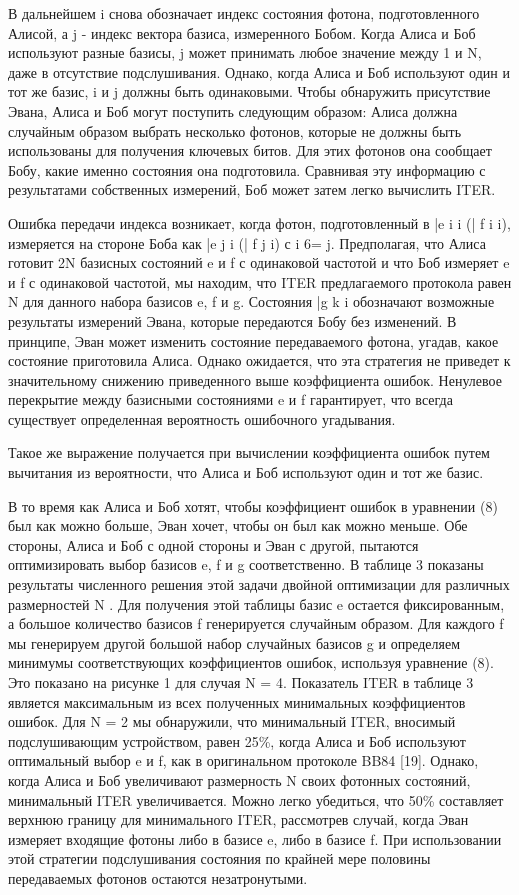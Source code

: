В дальнейшем i снова обозначает индекс состояния фотона, подготовленного Алисой, а j - индекс вектора базиса, измеренного Бобом. Когда Алиса и Боб используют разные базисы, j может принимать любое значение между 1 и N, даже в отсутствие подслушивания. Однако, когда Алиса и Боб используют один и тот же базис, i и j должны быть одинаковыми. Чтобы обнаружить присутствие Эвана, Алиса и Боб могут поступить следующим образом: Алиса должна случайным образом выбрать несколько фотонов, которые не должны быть использованы для получения ключевых битов. Для этих фотонов она сообщает Бобу, какие именно состояния она подготовила. Сравнивая эту информацию с результатами собственных измерений, Боб может затем легко вычислить ITER.

Ошибка передачи индекса возникает, когда фотон, подготовленный в |e i i (| f i i), измеряется на стороне Боба как |e j i (| f j i) с i 6= j. Предполагая, что Алиса готовит 2N базисных состояний e и f с одинаковой частотой и что Боб измеряет e и f с одинаковой частотой, мы находим, что ITER предлагаемого протокола равен N для данного набора базисов e, f и g. Состояния |g k i обозначают возможные результаты измерений Эвана, которые передаются Бобу без изменений. В принципе, Эван может изменить состояние передаваемого фотона, угадав, какое состояние приготовила Алиса. Однако ожидается, что эта стратегия не приведет к значительному снижению приведенного выше коэффициента ошибок. Ненулевое перекрытие между базисными состояниями e и f гарантирует, что всегда существует определенная вероятность ошибочного угадывания.

Такое же выражение получается при вычислении коэффициента ошибок путем вычитания из вероятности, что Алиса и Боб используют один и тот же базис.

В то время как Алиса и Боб хотят, чтобы коэффициент ошибок в уравнении (8) был как можно больше, Эван хочет, чтобы он был как можно меньше. Обе стороны, Алиса и Боб с одной стороны и Эван с другой, пытаются оптимизировать выбор базисов e, f и g соответственно. В таблице 3 показаны результаты численного решения этой задачи двойной оптимизации для различных размерностей N . Для получения этой таблицы базис e остается фиксированным, а большое количество базисов f генерируется случайным образом. Для каждого f мы генерируем другой большой набор случайных базисов g и определяем минимумы соответствующих коэффициентов ошибок, используя уравнение (8). Это показано на рисунке 1 для случая N = 4. Показатель ITER в таблице 3 является максимальным из всех полученных минимальных коэффициентов ошибок.
Для N = 2 мы обнаружили, что минимальный ITER, вносимый подслушивающим устройством, равен 25\%, когда Алиса и Боб используют оптимальный выбор e и f, как в оригинальном протоколе BB84 [19]. Однако, когда Алиса и Боб увеличивают размерность N своих фотонных состояний, минимальный ITER увеличивается. Можно легко убедиться, что 50\% составляет верхнюю границу для минимального ITER, рассмотрев случай, когда Эван измеряет входящие фотоны либо в базисе e, либо в базисе f. При использовании этой стратегии подслушивания состояния по крайней мере половины передаваемых фотонов остаются незатронутыми.

